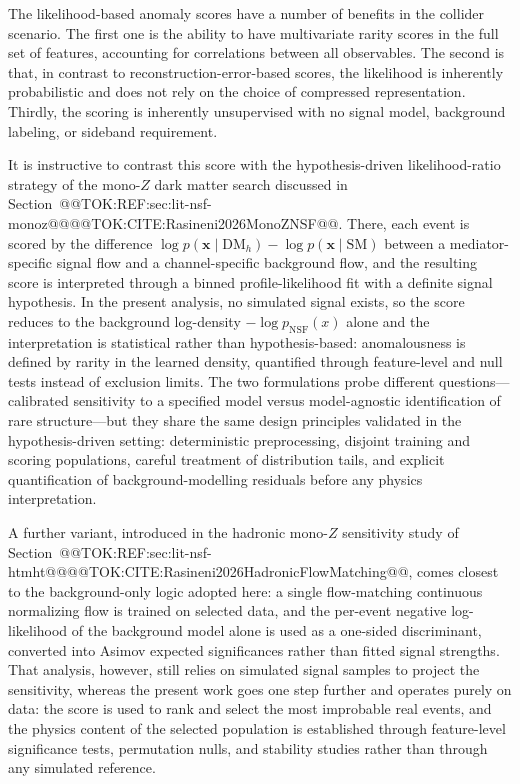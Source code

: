 \documentclass[11pt]{article}
\begin{document}
The likelihood-based anomaly scores have a number of benefits in the collider scenario. The first one is the ability to have multivariate rarity scores in the full set of features, accounting for correlations between all observables. The second is that, in contrast to reconstruction-error-based scores, the likelihood is inherently probabilistic and does not rely on the choice of compressed representation. Thirdly, the scoring is inherently unsupervised with no signal model, background labeling, or sideband requirement.

It is instructive to contrast this score with the hypothesis-driven likelihood-ratio strategy of the mono-$Z$ dark matter search discussed in Section~@@TOK:REF:sec:lit-nsf-monoz@@@@TOK:CITE:Rasineni2026MonoZNSF@@. There, each event is scored by the difference $\log p(\mathbf{x}\mid\mathrm{DM}_h) - \log p(\mathbf{x}\mid\mathrm{SM})$ between a mediator-specific signal flow and a channel-specific background flow, and the resulting score is interpreted through a binned profile-likelihood fit with a definite signal hypothesis. In the present analysis, no simulated signal exists, so the score reduces to the background log-density $-\log p_{\mathrm{NSF}}(x)$ alone and the interpretation is statistical rather than hypothesis-based: anomalousness is defined by rarity in the learned density, quantified through feature-level and null tests instead of exclusion limits. The two formulations probe different questions---calibrated sensitivity to a specified model versus model-agnostic identification of rare structure---but they share the same design principles validated in the hypothesis-driven setting: deterministic preprocessing, disjoint training and scoring populations, careful treatment of distribution tails, and explicit quantification of background-modelling residuals before any physics interpretation.

A further variant, introduced in the hadronic mono-$Z$ sensitivity study of Section~@@TOK:REF:sec:lit-nsf-htmht@@@@TOK:CITE:Rasineni2026HadronicFlowMatching@@, comes closest to the background-only logic adopted here: a single flow-matching continuous normalizing flow is trained on selected data, and the per-event negative log-likelihood of the background model alone is used as a one-sided discriminant, converted into Asimov expected significances rather than fitted signal strengths. That analysis, however, still relies on simulated signal samples to project the sensitivity, whereas the present work goes one step further and operates purely on data: the score is used to rank and select the most improbable real events, and the physics content of the selected population is established through feature-level significance tests, permutation nulls, and stability studies rather than through any simulated reference.
\end{document}
